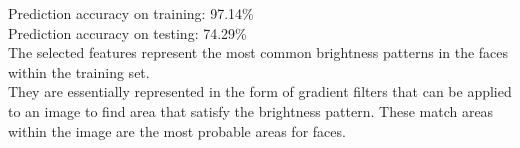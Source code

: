 
Prediction accuracy on training: 97.14\%\\
Prediction accuracy on testing: 74.29\%\\

The selected features represent the most common brightness patterns in the faces within the training set. \\

They are essentially represented in the form of gradient filters that can be applied to an image to find area that satisfy the brightness pattern. These match areas within the image are the most probable areas for faces.
